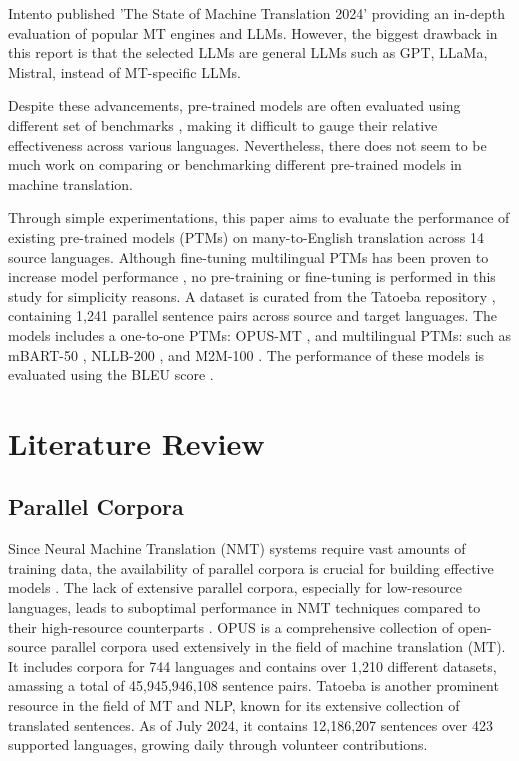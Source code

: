 \documentclass[a4paper]{article}
\begin{document}
Intento published 'The State of Machine Translation 2024' \cite{intento-2020} providing an in-depth evaluation of popular MT engines and LLMs. However, the biggest drawback in this report is that the selected LLMs are general LLMs such as GPT, LLaMa, Mistral, instead of MT-specific LLMs.

Despite these advancements, pre-trained models are often evaluated using different set of benchmarks \cite{liu-2020-mbart,nllb200-2020,fan-2020-m2m100,wei-2023-polylm}, making it difficult to gauge their relative effectiveness across various languages. Nevertheless, there does not seem to be much work on comparing or benchmarking different pre-trained models in machine translation.

Through simple experimentations, this paper aims to evaluate the performance of existing pre-trained models (PTMs) on many-to-English translation across 14 source languages. Although fine-tuning multilingual PTMs has been proven to increase model performance \cite{cooper-stickland-2021-recipes}, no pre-training or fine-tuning is performed in this study for simplicity reasons. A dataset is curated from the Tatoeba repository \cite{tatoeba}, containing 1,241 parallel sentence pairs across source and target languages. The models includes a one-to-one PTMs: OPUS-MT \cite{tiedemann-2020-opus-mt}, and multilingual PTMs: such as mBART-50 \cite{liu-2020-mbart}, NLLB-200 \cite{nllb200-2020}, and M2M-100 \cite{fan-2020-m2m100}. The performance of these models is evaluated using the BLEU score \cite{papieni-2002-bleu}.




\section{Literature Review}

\subsection{Parallel Corpora}

Since Neural Machine Translation (NMT) systems require vast amounts of training data, the availability of parallel corpora is crucial for building effective models \cite{koehn-2017-challenges}. The lack of extensive parallel corpora, especially for low-resource languages, leads to suboptimal performance in NMT techniques compared to their high-resource counterparts \cite{ranathunga-2023-nmt-low-res}. OPUS \cite{opus} is a comprehensive collection of open-source parallel corpora used extensively in the field of machine translation (MT). It includes corpora for 744 languages and contains over 1,210 different datasets, amassing a total of 45,945,946,108 sentence pairs. Tatoeba \cite{tatoeba} is another prominent resource in the field of MT and NLP, known for its extensive collection of translated sentences. As of July 2024, it contains 12,186,207 sentences over 423 supported languages, growing daily through volunteer contributions.
\end{document}
